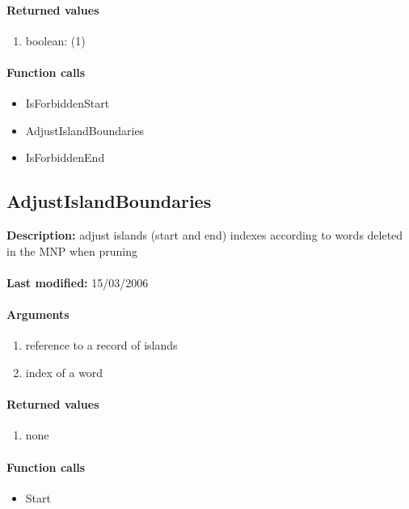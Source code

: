 \paragraph{Returned values}
\begin{enumerate}
\item boolean: (1)
\end{enumerate}

\paragraph{Function calls}
\begin{itemize}
\item IsForbiddenStart
\item AdjustIslandBoundaries
\item IsForbiddenEnd
\end{itemize}

\subsection{AdjustIslandBoundaries}
\textbf{Description:} adjust islands (start and end) indexes according to words deleted in the MNP when pruning\\
\\\textbf{Last modified:} 15/03/2006

\paragraph{Arguments}
\begin{enumerate}
\item reference to a record of islands
\item index of a word
\end{enumerate}

\paragraph{Returned values}
\begin{enumerate}
\item none
\end{enumerate}

\paragraph{Function calls}
\begin{itemize}
\item Start
\end{itemize}

